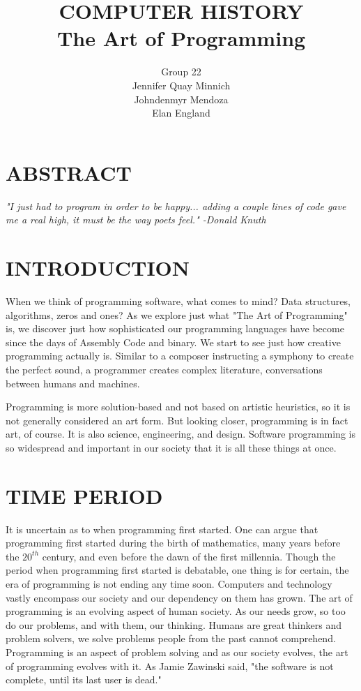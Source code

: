 \documentclass[letterpaper, 10 pt, conference]{IEEEconf}
\title{\LARGE \bf
COMPUTER HISTORY\\
\large The Art of Programming
}
\author{Group 22\\
\small Jennifer Quay Minnich\\
\small Johndenmyr Mendoza\\
\small Elan England\\
}
\begin{document}
\maketitle
\thispagestyle{empty}
\pagestyle{empty}


\section*{ABSTRACT}
\textit{
"I just had to program in order to be happy... 
adding a couple lines of code gave me a real high, 
it must be the way poets feel." 
-Donald Knuth
}

\section{INTRODUCTION}

When we think of programming software, what comes to mind?  Data structures, 
algorithms, zeros and ones? As we explore just what "The Art of Programming" is,
we discover just how sophisticated our programming languages have become 
since the days of Assembly Code and binary. We start to see just how creative
programming actually is. Similar to a composer instructing a symphony to create
the perfect sound, a programmer creates complex literature, conversations between 
humans and machines.

Programming is more solution-based and not based on artistic heuristics, so it is 
not generally considered an art form. But looking closer, programming is in fact art,
of course. It is also science, engineering, and design. Software programming is so 
widespread and important in our society that it is all these things at once.

\section{TIME PERIOD}

It is uncertain as to when programming first started. One can argue that programming first started during the birth of mathematics, many years before the $20^{th}$ century, and even before the dawn of the first millennia. Though the period when programming first started is debatable, one thing is for certain, the era of programming is not ending any time soon. Computers and technology vastly encompass our society and our dependency on them has grown. The art of programming is an evolving aspect of human society. As our needs grow, so too do our problems, and with them, our thinking. Humans are great thinkers and problem solvers, we solve problems people from the past cannot comprehend. Programming is an aspect of problem solving and as our society evolves, the art of programming evolves with it. As Jamie Zawinski said, "the software is not complete, until its last user is dead."
\end{document}
